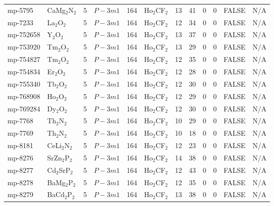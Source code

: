 {\begin{longtable}{llcccccccccc}
    mp-5795 & CaMg$_{2}$N$_{2}$ & 5     & $P-3m1$ & 164   & Ho$_{2}$CF$_{2}$ & 13    & 41    & 0     & 0     & FALSE & N/A \\
    mp-7233 & La$_{2}$O$_{2}$ & 5     & $P-3m1$ & 164   & Ho$_{2}$CF$_{2}$ & 12    & 34    & 0     & 0     & FALSE & N/A \\
    mp-752658 & Y$_{2}$O$_{2}$ & 5     & $P-3m1$ & 164   & Ho$_{2}$CF$_{2}$ & 13    & 37    & 0     & 0     & FALSE & N/A \\
    mp-753920 & Tm$_{2}$O$_{2}$ & 5     & $P-3m1$ & 164   & Ho$_{2}$CF$_{2}$ & 13    & 29    & 0     & 0     & FALSE & N/A \\
    mp-754827 & Tm$_{2}$O$_{2}$ & 5     & $P-3m1$ & 164   & Ho$_{2}$CF$_{2}$ & 12    & 35    & 0     & 0     & FALSE & N/A \\
    mp-754834 & Er$_{2}$O$_{2}$ & 5     & $P-3m1$ & 164   & Ho$_{2}$CF$_{2}$ & 12    & 28    & 0     & 0     & FALSE & N/A \\
    mp-755340 & Tb$_{2}$O$_{2}$ & 5     & $P-3m1$ & 164   & Ho$_{2}$CF$_{2}$ & 12    & 30    & 0     & 0     & FALSE & N/A \\
    mp-768908 & Ho$_{2}$O$_{2}$ & 5     & $P-3m1$ & 164   & Ho$_{2}$CF$_{2}$ & 12    & 29    & 0     & 0     & FALSE & N/A \\
    mp-769284 & Dy$_{2}$O$_{2}$ & 5     & $P-3m1$ & 164   & Ho$_{2}$CF$_{2}$ & 12    & 30    & 0     & 0     & FALSE & N/A \\
    mp-7768 & Th$_{2}$N$_{2}$ & 5     & $P-3m1$ & 164   & Ho$_{2}$CF$_{2}$ & 10    & 29    & 0     & 0     & FALSE & N/A \\
    mp-7769 & Th$_{2}$N$_{2}$ & 5     & $P-3m1$ & 164   & Ho$_{2}$CF$_{2}$ & 10    & 18    & 0     & 0     & FALSE & N/A \\
    mp-8181 & CeLi$_{2}$N$_{2}$ & 5     & $P-3m1$ & 164   & Ho$_{2}$CF$_{2}$ & 12    & 23    & 0     & 0     & FALSE & N/A \\
    mp-8276 & SrZn$_{2}$P$_{2}$ & 5     & $P-3m1$ & 164   & Ho$_{2}$CF$_{2}$ & 14    & 38    & 0     & 0     & FALSE & N/A \\
    mp-8277 & Cd$_{2}$SrP$_{2}$ & 5     & $P-3m1$ & 164   & Ho$_{2}$CF$_{2}$ & 12    & 43    & 0     & 0     & FALSE & N/A \\
    mp-8278 & BaMg$_{2}$P$_{2}$ & 5     & $P-3m1$ & 164   & Ho$_{2}$CF$_{2}$ & 12    & 35    & 0     & 0     & FALSE & N/A \\
    mp-8279 & BaCd$_{2}$P$_{2}$ & 5     & $P-3m1$ & 164   & Ho$_{2}$CF$_{2}$ & 13    & 38    & 0     & 0     & FALSE & N/A \\

\end{longtable}}
